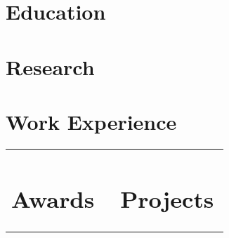 \documentclass{cv}
\begin{document}

    \section{Education}
        

    \section{Research}
        
    
    \section{Work Experience}
        
        

    \hspace*{-0.9cm}
    \begin{tabular}{p{0.488\linewidth}p{0.488\linewidth}}
        \section{Awards}
            
            
            

        &

        \section{Projects}
            
            
            
    \end{tabular}
\end{document}
